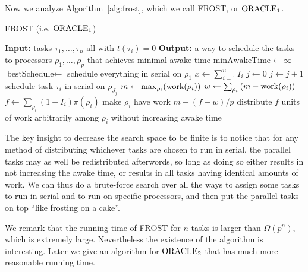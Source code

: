 Now we analyze Algorithm~\ref{alg:frost}, which we call
FROST, or $\operatorname{\text{ORACLE}}_1$. 

\begin{algorithm}
  \caption{FROST (i.e. $\operatorname{\text{ORACLE}}_1$)}
  \label{alg:frost}
  \begin{algorithmic}
    \State \textbf{Input:} tasks $\tau_1,\ldots, \tau_n$ all with $t(\tau_i) = 0$
    \State \textbf{Output:} a way to schedule the tasks to
    processors $\rho_1, \ldots, \rho_p$ that achieves minimal awake time
    \State 
    \State $\text{minAwakeTime} \gets \infty$
    \State $\text{bestSchedule} \gets $ schedule everything in serial on $\rho_1$
      \State $x \gets \sum_{i=1}^n I_i$
        \State $j \gets 0$
            \State $j \gets j+1$
            \State schedule task $\tau_i$ in serial on $\rho_{J_j}$
          \EndIf
        \EndFor
        \State $m \gets \max_{\rho_i}(\operatorname{\text{work}}(\rho_i))$
        \State $w \gets \sum_{\rho_i} \left( m - \operatorname{\text{work}}(\rho_i) \right)$
        \State $f \gets \sum_{\rho_i} (1-I_i)\pi(\rho_i)$
          \State make $\rho_i$ have work $m + (f-w)/p$
        \Else 
          \State distribute $f$ units of work arbitrarily 
          \State among $\rho_i$ without increasing awake time
        \EndIf
        \EndIf
      \EndFor
    \EndFor
  \end{algorithmic}
\end{algorithm}

The key insight to decrease the search space to be finite is to
notice that for any method of distributing whichever tasks are
chosen to run in serial, the parallel tasks may as well be
redistributed afterwords, so long as doing so either results in
not increasing the awake time, or results in all tasks having
identical amounts of work.
We can thus do a brute-force search over all the ways to assign some
tasks to run in serial and to run on specific processors, and
then put the parallel tasks on top \enquote{like frosting on a cake}. 

We remark that the running time of FROST for $n$ tasks is 
larger than $\Omega(p^n)$, which is extremely large. Nevertheless the
existence of the algorithm is interesting. Later we give an
algorithm for $\operatorname{\text{ORACLE}}_2$ that has much more reasonable running
time.

